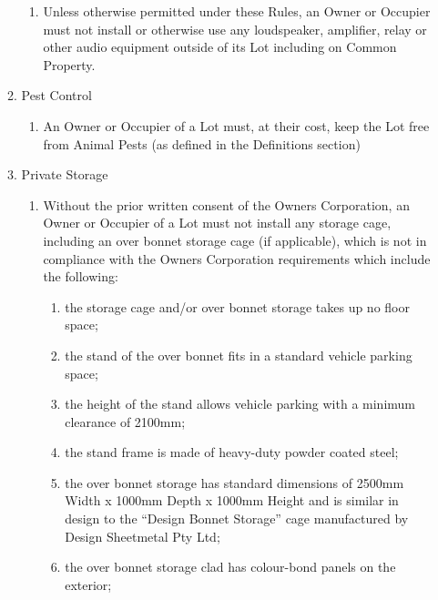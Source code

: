 \documentclass{article}
\begin{document}
\begin{enumerate}[label=\arabic*.]
\begin{enumerate}[label=\arabic{enumi}.\arabic*.]
\begin{enumerate}[label=(\arabic*)]
\item  Unless otherwise permitted under these Rules, an Owner or Occupier must not install or otherwise use any loudspeaker, amplifier, relay or other audio equipment outside of its Lot including on Common Property.

\end{enumerate}

\item  Pest Control

\begin{enumerate}[label=(\arabic*)]

\item  An Owner or Occupier of a Lot must, at their cost, keep the Lot free from Animal Pests (as defined in the Definitions section)

\end{enumerate}

\item  Private Storage

\begin{enumerate}[label=(\arabic*)]

\item  Without the prior written consent of the Owners Corporation, an Owner or Occupier of a Lot must not install any storage cage, including an over bonnet storage cage (if applicable), which is not in compliance with the Owners Corporation requirements which include the following:

\begin{enumerate}[label=(\alph*)]

\item  the storage cage and/or over bonnet storage takes up no floor space;

\item  the stand of the over bonnet fits in a standard vehicle parking space;

\item  the height of the stand allows vehicle parking with a minimum clearance of 2100mm;

\item  the stand frame is made of heavy-duty powder coated steel;

\item  the over bonnet storage has standard dimensions of 2500mm Width x 1000mm Depth x 1000mm Height and is similar in design to the “Design Bonnet Storage” cage manufactured by Design Sheetmetal Pty Ltd;

\item  the over bonnet storage clad has colour-bond panels on the exterior;


\end{enumerate}
\end{enumerate}
\end{enumerate}
\end{enumerate}
\end{document}
